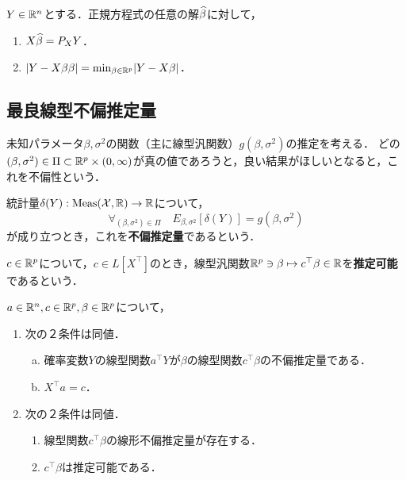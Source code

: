 \documentclass[uplatex,dvipdfmx]{jsreport}
\begin{document}
\begin{theorem}
    $Y\in\mathbb{R}^n$とする．正規方程式の任意の解$\widehat{\beta}$に対して，
    \begin{enumerate}
        \item $X\widehat{\beta}=P_XY$．
        \item $\lvert Y-X\beta{\beta}\rvert=\min_{\beta\in\mathbb{R}^p}\lvert Y-X\beta\rvert$．
    \end{enumerate}
\end{theorem}

\subsection{最良線型不偏推定量}

\begin{tcolorbox}[colframe=ForestGreen, colback=ForestGreen!10!white,breakable,colbacktitle=ForestGreen!40!white,coltitle=black,fonttitle=\bfseries\sffamily,
title=]
    未知パラメータ$\beta,\sigma^2$の関数（主に線型汎関数）$g(\beta,\sigma^2)$の推定を考える．
    どの$(\beta,\sigma^2)\in\Pi\subset\mathbb{R}^p\times(0,\infty)$が真の値であろうと，良い結果がほしいとなると，これを不偏性という．
\end{tcolorbox}

\begin{definition}
    統計量$\delta(Y):\mathrm{Meas}(\mathcal{X},\mathbb{R})\to\mathbb{R}$について，
    \[\forall_{(\beta,\sigma^2)\in\Pi}\quad E_{\beta,\sigma^2}[\delta(Y)]=g(\beta,\sigma^2)\]
    が成り立つとき，これを\textbf{不偏推定量}であるという．
\end{definition}

\begin{definition}[estimable]
    $c\in\mathbb{R}^p$について，$c\in L[X^\top]$のとき，線型汎関数$\mathbb{R}^p\ni\beta\mapsto c^\top\beta\in\mathbb{R}$を\textbf{推定可能}であるという．
\end{definition}

\begin{theorem}
    $a\in\mathbb{R}^n,c\in\mathbb{R}^p,\beta\in\mathbb{R}^p$について，
    \begin{enumerate}
        \item 次の２条件は同値．
        \begin{enumerate}[(a)]
            \item 確率変数$Y$の線型関数$a^\top Y$が$\beta$の線型関数$c^\top\beta$の不偏推定量である．
            \item $X^\top a=c$．
        \end{enumerate}
        \item 次の２条件は同値．
        \begin{enumerate}
            \item 線型関数$c^\top\beta$の線形不偏推定量が存在する．
            \item $c^\top\beta$は推定可能である．
        \end{enumerate}
    \end{enumerate}
\end{theorem}
\end{document}
